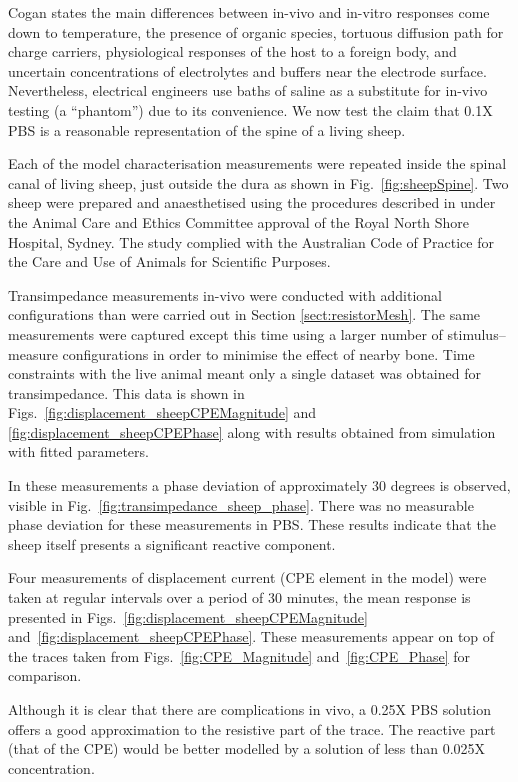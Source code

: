 \documentclass[journal, a4paper]{IEEEtran}
\begin{document}
Cogan states the main differences between in-vivo and in-vitro responses come down to temperature, the presence of organic species, tortuous diffusion path for charge carriers, physiological responses of the host to a foreign body, and uncertain concentrations of electrolytes and buffers near the electrode surface.\cite{Cogan2008}
Nevertheless, electrical engineers use baths of saline as a substitute for in-vivo testing (a ``phantom'') due to its convenience.
We now test the claim that 0.1X PBS is a reasonable representation of the spine of a living sheep.

Each of the model characterisation measurements were repeated inside the spinal canal of living sheep, just outside the dura as shown in Fig.~\ref{fig:sheepSpine}. Two sheep were prepared and anaesthetised using the procedures described in \cite{Parker2013} under the Animal Care and Ethics Committee approval of the Royal North Shore Hospital, Sydney. The study complied with the Australian Code of Practice for the Care and Use of Animals for Scientific Purposes.

Transimpedance measurements in-vivo were conducted with additional configurations than were carried out in Section \ref{sect:resistorMesh}. The same measurements were captured except this time using a larger number of stimulus--measure configurations in order to minimise the effect of nearby bone. Time constraints with the live animal meant only a single dataset was obtained for transimpedance. This data is shown in Figs.~\ref{fig:displacement_sheepCPEMagnitude} and \ref{fig:displacement_sheepCPEPhase} along with results obtained from simulation with fitted parameters.

In these measurements a phase deviation of approximately 30 degrees is observed, visible in Fig.~\ref{fig:transimpedance_sheep_phase}. There was no measurable phase deviation for these measurements in PBS. These results indicate that the sheep itself presents a significant reactive component.

Four measurements of displacement current (CPE element in the model) were taken at regular intervals over a period of 30 minutes, the mean response is presented in Figs.~\ref{fig:displacement_sheepCPEMagnitude} and~\ref{fig:displacement_sheepCPEPhase}.
These measurements appear on top of the traces taken from Figs.~\ref{fig:CPE_Magnitude} and~\ref{fig:CPE_Phase} for comparison.

Although it is clear that there are complications in vivo, a 0.25X PBS solution offers a good approximation to the resistive part of the  trace.
The reactive part (that of the CPE) would be better modelled by a solution of less than 0.025X concentration.  
\end{document}
